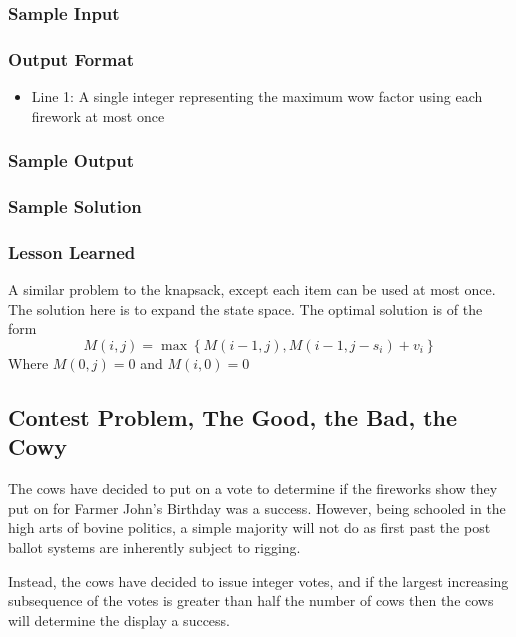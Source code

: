 \subsubsection{Sample Input}


\subsubsection{Output Format}
\begin{itemize}
	\item Line 1: A single integer representing the maximum wow factor using each firework at most once
\end{itemize}
\subsubsection{Sample Output}


\subsubsection{Sample Solution}


\subsubsection{Lesson Learned}
A similar problem to the knapsack, except each item can be used at most once.  The solution here is to expand the state space.  The optimal solution is of the form
$$M(i,j) = \max \left\{ M(i-1, j) , M(i-1, j- s_i) + v_i \right\}$$
Where $M(0,j) = 0$ and $M(i,0) = 0$

\subsection{Contest Problem, The Good, the Bad, the Cowy}
The cows have decided to put on a vote to determine if the fireworks show they put on for Farmer John's Birthday was a success.
However, being schooled in the high arts of bovine politics, a simple majority will not do as first past the post ballot systems are inherently subject to rigging.

Instead, the cows have decided to issue integer votes,
and if the largest increasing subsequence of the votes is greater than half the number of cows then the cows will determine the display a success.

